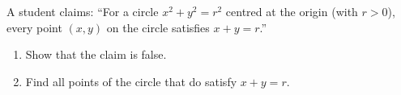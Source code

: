 A student claims: ``For a circle $x^2+y^2=r^2$ centred at the origin (with $r>0$), every point $(x,y)$ on the circle satisfies $x+y=r$.''
\begin{enumerate}
\item[(a)] Show that the claim is false.
\item[(b)] Find all points of the circle that do satisfy $x+y=r$.
\end{enumerate}
